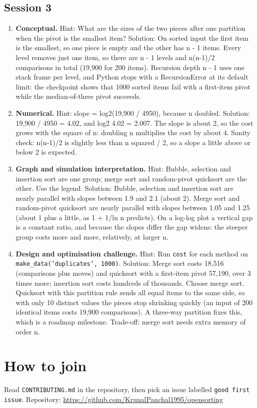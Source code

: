 \documentclass[11pt,a4paper]{article}
\begin{document}
\subsection*{Session 3}
\begin{enumerate}[nosep]
\item \textbf{Conceptual.} Hint: What are the sizes of the two pieces after one partition when the pivot is the smallest item? Solution: On sorted input the first item is the smallest, so one piece is empty and the other has n - 1 items. Every level removes just one item, so there are n - 1 levels and n(n-1)/2 comparisons in total (19,900 for 200 items). Recursion depth n - 1 uses one stack frame per level, and Python stops with a RecursionError at its default limit: the checkpoint shows that 1000 sorted items fail with a first-item pivot while the median-of-three pivot succeeds.
\item \textbf{Numerical.} Hint: slope = log2(19,900 / 4950), because n doubled. Solution: 19,900 / 4950 = 4.02, and log2 4.02 = 2.007. The slope is about 2, so the cost grows with the square of n: doubling n multiplies the cost by about 4. Sanity check: n(n-1)/2 is slightly less than n squared / 2, so a slope a little above or below 2 is expected.
\item \textbf{Graph and simulation interpretation.} Hint: Bubble, selection and insertion sort are one group; merge sort and random-pivot quicksort are the other. Use the legend. Solution: Bubble, selection and insertion sort are nearly parallel with slopes between 1.9 and 2.1 (about 2). Merge sort and random-pivot quicksort are nearly parallel with slopes between 1.05 and 1.25 (about 1 plus a little, as 1 + 1/ln n predicts). On a log-log plot a vertical gap is a constant ratio, and because the slopes differ the gap widens: the steeper group costs more and more, relatively, at larger n.
\item \textbf{Design and optimisation challenge.} Hint: Run \texttt{cost} for each method on \texttt{make\_data('duplicates', 1000)}. Solution: Merge sort costs 18,516 (comparisons plus moves) and quicksort with a first-item pivot 57,190, over 3 times more; insertion sort costs hundreds of thousands. Choose merge sort. Quicksort with this partition rule sends all equal items to the same side, so with only 10 distinct values the pieces stop shrinking quickly (an input of 200 identical items costs 19,900 comparisons). A three-way partition fixes this, which is a roadmap milestone. Trade-off: merge sort needs extra memory of order n.
\end{enumerate}

\section{How to join}
Read \texttt{CONTRIBUTING.md} in the repository, then pick an issue labelled \texttt{good first issue}. Repository: \url{https://github.com/KrunalPanchal1995/opensorting}
\end{document}
